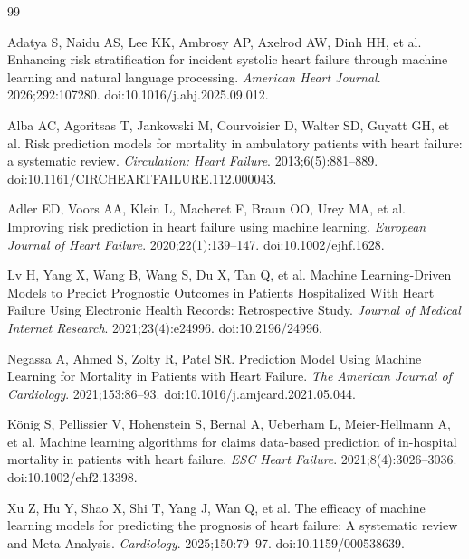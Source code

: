\documentclass[a4paper,12pt]{article}
\begin{document}
\begin{thebibliography}{99}

Adatya S, Naidu AS, Lee KK, Ambrosy AP, Axelrod AW, Dinh HH, et al.
Enhancing risk stratification for incident systolic heart failure through machine learning and natural language processing.
\textit{American Heart Journal}. 2026;292:107280.
doi:10.1016/j.ahj.2025.09.012.

Alba AC, Agoritsas T, Jankowski M, Courvoisier D, Walter SD, Guyatt GH, et al.
Risk prediction models for mortality in ambulatory patients with heart failure: a systematic review.
\textit{Circulation: Heart Failure}. 2013;6(5):881--889.
doi:10.1161/CIRCHEARTFAILURE.112.000043.

Adler ED, Voors AA, Klein L, Macheret F, Braun OO, Urey MA, et al.
Improving risk prediction in heart failure using machine learning.
\textit{European Journal of Heart Failure}. 2020;22(1):139--147.
doi:10.1002/ejhf.1628.

Lv H, Yang X, Wang B, Wang S, Du X, Tan Q, et al.
Machine Learning-Driven Models to Predict Prognostic Outcomes in Patients Hospitalized With Heart Failure Using Electronic Health Records: Retrospective Study.
\textit{Journal of Medical Internet Research}. 2021;23(4):e24996.
doi:10.2196/24996.

Negassa A, Ahmed S, Zolty R, Patel SR.
Prediction Model Using Machine Learning for Mortality in Patients with Heart Failure.
\textit{The American Journal of Cardiology}. 2021;153:86--93.
doi:10.1016/j.amjcard.2021.05.044.

König S, Pellissier V, Hohenstein S, Bernal A, Ueberham L,
Meier-Hellmann A, et al.
Machine learning algorithms for claims data-based prediction of in-hospital mortality in patients with heart failure.
\textit{ESC Heart Failure}. 2021;8(4):3026--3036.
doi:10.1002/ehf2.13398.

Xu Z, Hu Y, Shao X, Shi T, Yang J, Wan Q, et al.
The efficacy of machine learning models for predicting the prognosis of heart failure: A systematic review and Meta-Analysis.
\textit{Cardiology}. 2025;150:79--97.
doi:10.1159/000538639.

\end{thebibliography}
\end{document}
